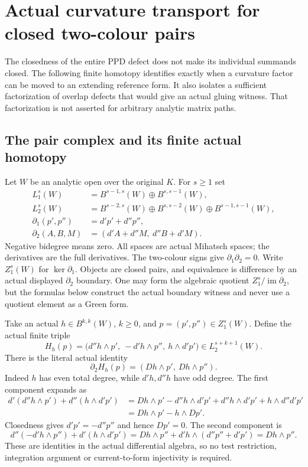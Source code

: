 \section{Actual curvature transport for closed two-colour pairs}
\label{sec:r9-closed-pair-curvature-transport}

The closedness of the entire PPD defect does not make its individual
summands closed.  The following finite homotopy identifies exactly
when a curvature factor can be moved to an extending reference form.
It also isolates a sufficient factorization of overlap defects that
would give an actual gluing witness.  That factorization is not
asserted for arbitrary analytic matrix paths.

\subsection{The pair complex and its finite actual homotopy}

Let $W$ be an analytic open over the original $K$.  For $s\ge1$ set
\[
 \begin{split}
 L_1^s(W)&=B^{s-1,s}(W)\oplus B^{s,s-1}(W),\\
 L_2^s(W)&=B^{s-2,s}(W)\oplus B^{s,s-2}(W)
                         \oplus B^{s-1,s-1}(W),\\
 \partial_1(p',p'')&=d'p'+d''p'',\\
 \partial_2(A,B,M)&=(d'A+d''M,\ d''B+d'M).
 \end{split}
 \tag{CPT1}
\]
Negative bidegree means zero.  All spaces are actual Mihatsch
spaces; the derivatives are the full derivatives.  The two-colour
signs give $\partial_1\partial_2=0$.  Write $Z_1^s(W)$ for
$\ker\partial_1$.  Objects are closed pairs, and equivalence is
difference by an actual displayed $\partial_2$ boundary.  One may
form the algebraic quotient $Z_1^s/\operatorname{im}\partial_2$,
but the formulas below construct the actual boundary witness and
never use a quotient element as a Green form.

Take an actual $h\in B^{k,k}(W)$, $k\ge0$, and
$p=(p',p'')\in Z_1^s(W)$.  Define the actual finite triple
\[
 H_h(p)=\bigl(d''h\wedge p',\ -d'h\wedge p'',\
                                  h\wedge d'p'\bigr)
                         \in L_2^{s+k+1}(W).
 \tag{CPT2}
\]
There is the literal actual identity
\[
                \partial_2 H_h(p)=(Dh\wedge p',\ Dh\wedge p'').
 \tag{CPT3}
\]
Indeed $h$ has even total degree, while $d'h,d''h$ have odd
degree.  The first component expands as
\[
 \begin{split}
 d'(d''h\wedge p')+d''(h\wedge d'p')
   &=Dh\wedge p'-d''h\wedge d'p'
                +d''h\wedge d'p'+h\wedge d''d'p'\\
   &=Dh\wedge p'-h\wedge Dp'.
 \end{split}
 \tag{CPT4}
\]
Closedness gives $d'p'=-d''p''$ and hence $Dp'=0$.
The second component is
\[
 d''(-d'h\wedge p'')+d'(h\wedge d'p')
  =Dh\wedge p''+d'h\wedge(d''p''+d'p')=Dh\wedge p''.
 \tag{CPT5}
\]
These are identities in the actual differential algebra, so no
test restriction, integration argument or current-to-form
injectivity is required.

